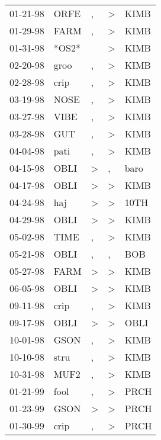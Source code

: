 \begin{supertabular}{lllll}
 01-21-98 &   ORFE &             , &  \textgreater &  KIMB \\
 01-29-98 &   FARM &             , &  \textgreater &  KIMB \\
 01-31-98 &  *OS2* &               &  \textgreater &  KIMB \\
 02-20-98 &   groo &             , &  \textgreater &  KIMB \\
 02-28-98 &   crip &             , &  \textgreater &  KIMB \\
 03-19-98 &   NOSE &             , &  \textgreater &  KIMB \\
 03-27-98 &   VIBE &             , &  \textgreater &  KIMB \\
 03-28-98 &    GUT &             , &  \textgreater &  KIMB \\
 04-04-98 &   pati &             , &  \textgreater &  KIMB \\
 04-15-98 &   OBLI &  \textgreater &             , &  baro \\
 04-17-98 &   OBLI &  \textgreater &  \textgreater &  KIMB \\
 04-24-98 &    haj &  \textgreater &  \textgreater &  10TH \\
 04-29-98 &   OBLI &  \textgreater &  \textgreater &  KIMB \\
 05-02-98 &   TIME &             , &  \textgreater &  KIMB \\
 05-21-98 &   OBLI &             , &             , &   BOB \\
 05-27-98 &   FARM &  \textgreater &  \textgreater &  KIMB \\
 06-05-98 &   OBLI &  \textgreater &  \textgreater &  KIMB \\
 09-11-98 &   crip &             , &  \textgreater &  KIMB \\
 09-17-98 &   OBLI &  \textgreater &  \textgreater &  OBLI \\
 10-01-98 &   GSON &             , &  \textgreater &  KIMB \\
 10-10-98 &   stru &             , &  \textgreater &  KIMB \\
 10-31-98 &   MUF2 &             , &  \textgreater &  KIMB \\
 01-21-99 &   fool &             , &  \textgreater &  PRCH \\
 01-23-99 &   GSON &  \textgreater &  \textgreater &  PRCH \\
 01-30-99 &   crip &             , &  \textgreater &  PRCH \\

\end{supertabular}
